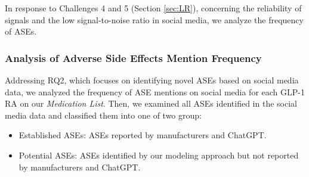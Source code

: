 \documentclass[referee,bst/sn-basic]{sn-jnl}%
\begin{document}
In response to Challenges 4 and 5 (Section \ref{sec:LR}), concerning the reliability of signals and the low signal-to-noise ratio in social media, we analyze the frequency of ASEs.

\subsubsection{Analysis of Adverse Side Effects Mention Frequency}
\label{sec:modelval}
Addressing RQ2, which focuses on identifying novel ASEs based on social media data, we analyzed the frequency of ASE mentions on social media for each GLP-1 RA on our \textit{Medication List}.
Then, we examined all ASEs identified in the social media data and classified them into one of two group:
\begin{itemize}
    \item 
    Established ASEs: ASEs reported by manufacturers and ChatGPT.

    \item 
    Potential ASEs: ASEs identified by our modeling approach but not reported by manufacturers and ChatGPT. 
\end{itemize}






\end{document}
